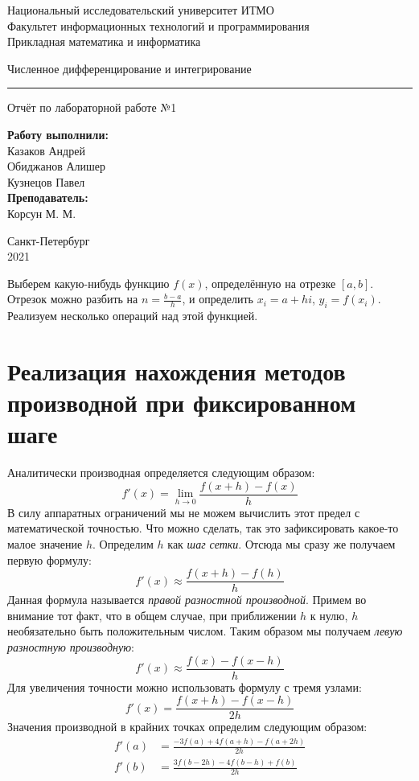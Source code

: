 \documentclass{article}
\begin{document}
\begin{center}
    Национальный исследовательский университет ИТМО \\
    Факультет информационных технологий и программирования \\
    Прикладная математика и информатика
\end{center}
\vspace{20em}
\begin{center}
    {\Large Численное дифференцирование и интегрирование}
    \vspace{3pt}
    \hrule
    \vspace{3pt}
    Отчёт по лабораторной работе №1
\end{center}
\vspace{20em}
\begin{flushright}
\textbf{ Работу выполнили: } \\
Казаков Андрей \\
Обиджанов Алишер \\
Кузнецов Павел \\
\vspace{1em}
\textbf{ Преподаватель: } \\
Корсун М. М.
\end{flushright}
\vspace{12em}
\begin{center}
    Санкт-Петербург \\
    2021
\end{center}
\newpage

Выберем какую-нибудь функцию $f(x)$, определённую на отрезке $[a, b]$.
Отрезок можно разбить на $n = \frac{b-a}{h}$, и определить $x_i = a + hi$, $y_i = f(x_i)$.
Реализуем несколько операций над этой функцией.

\section{Реализация нахождения методов производной при фиксированном шаге}

Аналитически производная определяется следующим образом:
$$f'(x)=\lim_{h \to 0} \frac{f(x+h)-f(x)}{h}$$
В силу аппаратных ограничений мы не можем вычислить этот предел с математической точностью.
Что можно сделать, так это зафиксировать какое-то малое значение $h$.
Определим $h$ как \textit{шаг сетки}. Отсюда мы сразу же получаем первую формулу:
$$f'(x) \approx \frac{f(x+h)-f(h)}{h}$$
Данная формула называется \textit{правой разностной производной}. Примем во внимание тот факт,
что в общем случае, при приближении $h$ к нулю, $h$ необязательно быть положительным числом.
Таким образом мы получаем \textit{левую разностную производную}:
$$f'(x) \approx \frac{f(x)-f(x-h)}{h}$$
Для увеличения точности можно использовать формулу с тремя узлами:
$$f'(x) = \frac{f(x+h) - f(x-h)}{2h}$$
Значения производной в крайних точках определим следующим образом:
\begin{align}
    f'(a) &= \frac{-3f(a) + 4f(a + h) - f(a + 2h)}{2h} \\
    f'(b) &= \frac{3f(b - 2h) - 4f(b - h) + f(b)}{2h}
\end{align}
\end{document}
